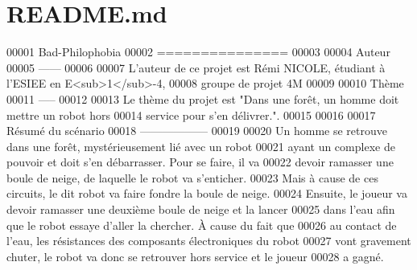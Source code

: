 \hypertarget{README_8md_source}{\section{R\-E\-A\-D\-M\-E.\-md}
}

\begin{DoxyCode}
00001 Bad-Philophobia
00002 ===============
00003 
00004 Auteur
00005 ------
00006 
00007 L\textcolor{stringliteral}{'auteur de ce projet est Rémi NICOLE, étudiant à l'}ESIEE en E<sub>1</sub>-4,
00008 groupe de projet 4M
00009 
00010 Thème
00011 -----
00012 
00013 Le thème du projet est \textcolor{stringliteral}{"Dans une forêt, un homme doit mettre un robot hors}
00014 \textcolor{stringliteral}{service pour s'en délivrer."}.
00015 
00016 
00017 Résumé du scénario
00018 ------------------
00019 
00020 Un homme se retrouve dans une forêt, mystérieusement lié avec un robot
00021 ayant un complexe de pouvoir et doit s\textcolor{stringliteral}{'en débarrasser. Pour se faire, il va}
00022 \textcolor{stringliteral}{devoir ramasser une boule de neige, de laquelle le robot va s'}enticher.
00023 Mais à cause de ces circuits, le dit robot va faire fondre la boule de neige.
00024 Ensuite, le joueur va devoir ramasser une deuxième boule de neige et la lancer
00025 dans l\textcolor{stringliteral}{'eau afin que le robot essaye d'}aller la chercher. À cause du fait que
00026 au contact de l\textcolor{stringliteral}{'eau, les résistances des composants électroniques du robot}
00027 \textcolor{stringliteral}{vont gravement chuter, le robot va donc se retrouver hors service et le joueur}
00028 \textcolor{stringliteral}{a gagné.}
\end{DoxyCode}
